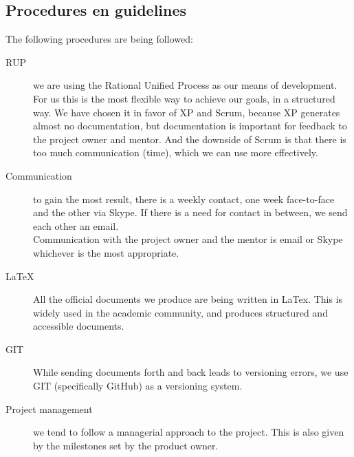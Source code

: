 \documentclass{article}
\begin{document}
\subsection{Procedures en guidelines}
The following procedures are being followed:
\begin{description}
  \item[RUP] we are using the Rational Unified Process as our means of
    development. For us this is the most flexible way to achieve our goals, in
    a structured way. We have chosen it in favor of XP and Scrum, because XP
    generates almost no documentation, but documentation is important for
    feedback to the project owner and mentor. And the downside of Scrum is that
    there is too much communication (time), which we can use more effectively.
  \item[Communication] to gain the most result, there is a weekly contact, one
    week face-to-face and the other via Skype. If there is a need for contact
    in between, we send each other an email.\\
    Communication with the project owner and the mentor is email or Skype
    whichever is the most appropriate.
  \item[LaTeX] All the official documents we produce are being written in
    LaTex. This is widely used in the academic community, and produces
    structured and accessible documents.
  \item[GIT] While sending documents forth and back leads to versioning errors,
    we use GIT (specifically GitHub) as a versioning system.
  \item[Project management] we tend to follow a managerial approach to the
    project. This is also given by the milestones set by the product owner.
\end{description}
\end{document}
